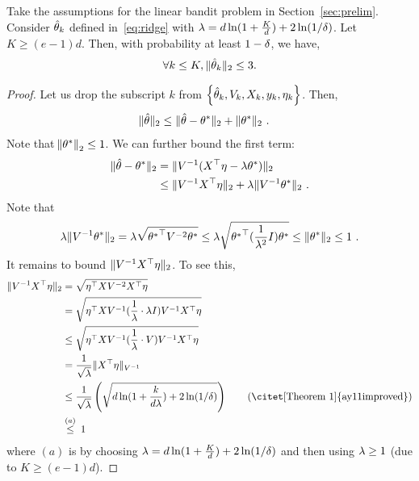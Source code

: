 \begin{lemma}\label{lem:rls_norm_bound}
  Take the assumptions for the linear bandit problem in Section~\ref{sec:prelim}. %
  Consider ${\hat{ \theta}}_k$ defined in~\eqref{eq:ridge} with  ${\lambda} = d\ln(1+{ \frac{K}{d} }) + 2 \ln(1/{\delta})$.
  Let $K \ge (e-1)d$.
  Then, with probability at least $1-{\delta}$, we have, 
  \begin{align*}
    \forall k \le K, \|{\hat{ \theta}}_k\|_2 \le 3.
  \end{align*}
\end{lemma}
\begin{proof}
  Let us drop the subscript $k$ from $\cbr{\hth_k, V_k, X_k, y_k, \eta_k}$.
  Then,
  \begin{align*}
    \|{\hat{ \theta}}\|_2
    &\le \|{\hat{ \theta}} - {\theta}^*\|_2 + \|{\theta}^*\|_2~.
  \end{align*}
  Note that $\norm{{\theta}^*}_2 \le 1$.
  We can further bound the first term:
  \begin{align*}
    \|{\hat{ \theta}} - {\theta}^*\|_2
    &=   \|V^{-1}(X^{\top}\eta - {\lambda} {\theta}^*) \|_2
    \\&\le \|V^{-1}X^{\top} \eta\|_2 + {\lambda} \| V^{-1} {\theta}^*\|_2~.
  \end{align*}
  Note that 
  \begin{align*}
    {\ensuremath{\lambda}} \|V^{-1}{\theta}^*\|_2 = {\lambda} \sqrt{{{\theta}^*}^{\top} V^{-2} {\theta}^*} 
    \le {\ensuremath{\lambda}} \sqrt{{{\theta}^*}^{\top} ({ \frac{1}{{\lambda}^2} } I) {\theta}^* } 
    \le \|{\theta}^*\|_2 \le 1~.
  \end{align*}
  It remains to bound $ \|V^{-1}X^{\top} \eta\|_2$.
  To see this,
  \begin{align*}
    \|V^{-1}X^\T \eta\|_2 
    &= \sqrt{\eta^\T X V^{-2} X^\T \eta} 
    \\&= \sqrt{\eta^\T X V^{-1} (\fr1\lam \cd \lam I)  V^{-1} X^\T \eta} 
    \\&\le \sqrt{\eta^\T X V^{-1} (\fr1\lam \cd V)  V^{-1} X^\T \eta} 
    \\&= \fr{1}{\sqrt{\lam} } \|X^\T\eta\|_{V^{-1}}
    \\&\le \fr{1}{\sqrt{\lam} } \del{ \sqrt{d\ln(1+\fr{k}{d\lam}) + 2 \ln(1/\dt)} } \tag{\citet[Theorem 1]{ay11improved}}
    \\&\sr{(a)}{\le} 1
  \end{align*}
  where $(a)$ is by choosing ${\lambda} = d\ln(1+{ \frac{K}{d} }) + 2 \ln(1/{\delta})$ and then using  ${\lambda} \ge 1$ (due to $K \ge (e-1)d$).
\end{proof}


